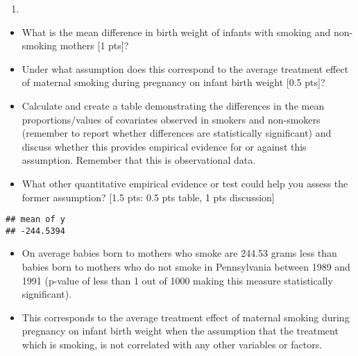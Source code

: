 \documentclass[
]{article}
\newenvironment{Shaded}{\begin{snugshade}}{\end{snugshade}}
\newcommand{\DecValTok}[1]{\textcolor[rgb]{0.00,0.00,0.81}{#1}}
\newcommand{\DocumentationTok}[1]{\textcolor[rgb]{0.56,0.35,0.01}{\textbf{\textit{#1}}}}
\newcommand{\FunctionTok}[1]{\textcolor[rgb]{0.13,0.29,0.53}{\textbf{#1}}}
\newcommand{\NormalTok}[1]{#1}
\newcommand{\OtherTok}[1]{\textcolor[rgb]{0.56,0.35,0.01}{#1}}
\newcommand{\SpecialCharTok}[1]{\textcolor[rgb]{0.81,0.36,0.00}{\textbf{#1}}}
\providecommand{\tightlist}{%
  \setlength{\itemsep}{0pt}\setlength{\parskip}{0pt}}
\begin{document}
\begin{enumerate}
\def\labelenumi{\alph{enumi})}
\tightlist
\item
\end{enumerate}

\begin{itemize}
\tightlist
\item
  What is the mean difference in birth weight of infants with smoking
  and non-smoking mothers {[}1 pts{]}?
\item
  Under what assumption does this correspond to the average treatment
  effect of maternal smoking during pregnancy on infant birth weight
  {[}0.5 pts{]}?
\item
  Calculate and create a table demonstrating the differences in the mean
  proportions/values of covariates observed in smokers and non-smokers
  (remember to report whether differences are statistically significant)
  and discuss whether this provides empirical evidence for or against
  this assumption. Remember that this is observational data.
\item
  What other quantitative empirical evidence or test could help you
  assess the former assumption? {[}1.5 pts: 0.5 pts table, 1 pts
  discussion{]}
\end{itemize}

\begin{Shaded}
\end{Shaded}

\begin{verbatim}
## mean of y 
## -244.5394
\end{verbatim}

\begin{itemize}
\item
  On average babies born to mothers who smoke are 244.53 grams less than
  babies born to mothers who do not smoke in Pennsylvania between 1989
  and 1991 (p-value of less than 1 out of 1000 making this measure
  statistically significant).
\item
  This corresponds to the average treatment effect of maternal smoking
  during pregnancy on infant birth weight when the assumption that the
  treatment which is smoking, is not correlated with any other variables
  or factors.
\end{itemize}
\end{document}
